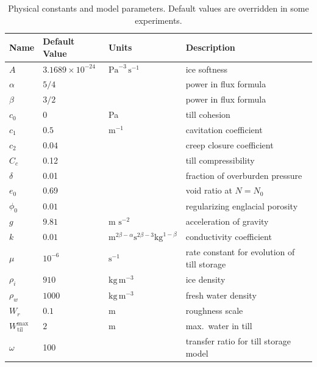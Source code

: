 \documentclass[11pt,final]{amsart}
\newcommand{\Wtilmax}{W_{\text{til}}^{\text{max}}}
\begin{document}
\begin{table}[ht]
  \centering
  \caption{Physical constants and model parameters.  Default values are overridden in some experiments.}
  \begin{tabular}{lllp{3.0in}} 
    \textbf{Name} & \textbf{Default Value} & \textbf{Units} & \textbf{Description}\\
\hline
    $A$ & $3.1689\times 10^{-24}$ & $\text{Pa}^{-3}\,\text{s}^{-1}$ & ice softness \citep{EISMINT96} \phantom{$\Big|$} \\
    $\alpha$ & $5/4$ & & power in flux formula  \citep{Schoofetal2012} \\
    $\beta$ & $3/2$ & & power in flux formula  \citep{Schoofetal2012} \\
    $c_0$ & 0 & Pa & till cohesion \citep{Tulaczyketal2000} \\
    $c_1$ & $0.5$ & $\text{m}^{-1}$ & cavitation coefficient \citep{Schoofetal2012} \\
    $c_2$ & $0.04$ & & creep closure coefficient \\
    $C_c$ & 0.12 &  & till compressibility \citep{Tulaczyketal2000} \\
    $\delta$ & 0.01 &  & fraction of overburden pressure \\
    $e_0$ & 0.69 &  & void ratio at $N=N_0$ \citep{Tulaczyketal2000} \\
    $\phi_0$ & $0.01$ & & regularizing englacial porosity \\
    $g$ & $9.81$ & m $\text{s}^{-2}$ & acceleration of gravity \\
    $k$ & $0.01$ & $\text{m}^{2\beta-\alpha} \text{s}^{2\beta-3} \text{kg}^{1-\beta}$ & conductivity coefficient \citep{Schoofetal2012} \\
    $\mu$ & $10^{-6}$ & $\text{s}^{-1}$ & rate constant for evolution of till storage \\
    $\rho_i$ & $910$ & $\text{kg}\,\text{m}^{-3}$ & ice density \citep{GreveBlatter2009} \\
    $\rho_w$ & $1000$ & $\text{kg}\,\text{m}^{-3}$ & fresh water density \citep{GreveBlatter2009} \\
    $W_r$ & $0.1$ & $\text{m}$ & roughness scale \citep{Hewittetal2012} \\
    $\Wtilmax$ & $2\phantom{\Big|}$ & $\text{m}$ & max.~water in till \citep{BBssasliding} \\
    $\omega$ & 100 & & transfer ratio for till storage model \\
    \hline
  \end{tabular}
 \label{tab:constants}
\end{table}
\end{document}
